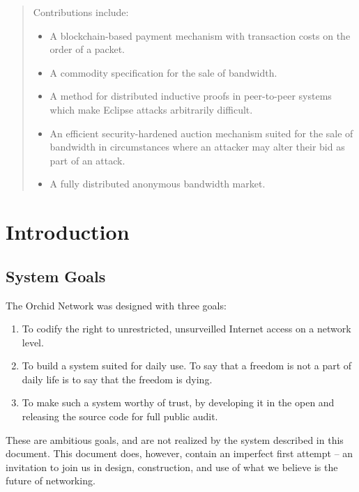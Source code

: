 \documentclass{article}
\newcommand{\mesh}{Orchid}
\begin{document}
\begin{abstract}
  Contributions include:

  \begin{itemize}
  \item A blockchain-based payment mechanism with transaction costs on
    the order of a packet.
  \item A commodity specification for the sale of bandwidth.
  \item A method for distributed inductive proofs in peer-to-peer
    systems which make Eclipse attacks arbitrarily difficult.
  \item An efficient security-hardened auction mechanism suited for
    the sale of bandwidth in circumstances where an attacker may alter
    their bid as part of an attack.
  \item A fully distributed anonymous bandwidth market.
  \end{itemize}

\end{abstract}


\newpage
\tableofcontents
\newpage


\section{Introduction}
\label{sec:overview}

\subsection{System Goals}

The \mesh{} Network was designed with three goals:

\begin{enumerate}
\item To codify the right to unrestricted, unsurveilled Internet access on a network level.
\item To build a system suited for daily use. To say that a freedom is not a part of daily life is to say that the freedom is dying.
\item To make such a system worthy of trust, by developing it in the open and releasing the source code for full public audit.
\end{enumerate}

These are ambitious goals, and are not realized by the system described in this document. This document does, however, contain an imperfect first attempt – an invitation to join us in design, construction, and use of what we believe is the future of networking.
\end{document}
